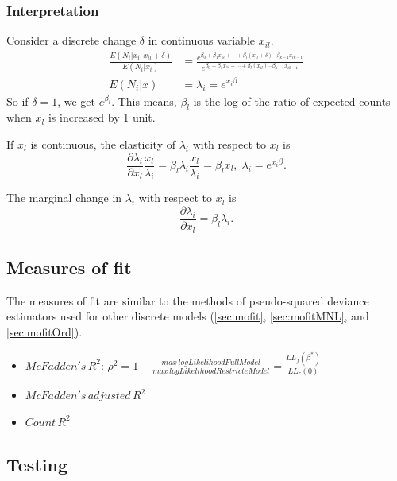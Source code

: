 			\subsubsection{Interpretation}
				Consider a discrete change $\delta$ in continuous variable $x_{il}$.
				\begin{align*}
					\frac{E\left(N_i|x_i,x_{il}+\delta \right)}{E\left(N_i|x_i\right)}&=\frac{e^{\beta_0+\beta_1 x_{1l}+\cdots+\beta_l (x_{il}+\delta) \cdots \beta_{k-1} x_{ik-1}}}{e^{\beta_0+\beta_1 x_{1l}+\cdots+\beta_l (x_{il}) \cdots \beta_{k-1} x_{ik-1}}}\\
					E\left(N_i|x\right)&=\lambda_i=e^{x_i\beta}
				\end{align*}
				So if $\delta=1$, we get $e^{\beta_l}$. This means, $\beta_l$ is the log of the ratio of expected counts when $x_l$ is increased by 1 unit.
				
				If $x_l$ is continuous, the elasticity of $\lambda_i$ with respect to $x_l$ is
				\begin{equation*}
					\frac{\partial \lambda_i}{\partial x_l} \frac{x_l}{\lambda_i}=\beta_l \lambda_i \frac{x_l}{\lambda_i}=\beta_l x_l,\;\lambda_i=e^{x_i\beta}.
				\end{equation*}
				
				The marginal change in $\lambda_i$ with respect to $x_l$ is
				\begin{equation*}
					\frac{\partial \lambda_i}{\partial x_l}=\beta_l \lambda_i.
				\end{equation*}				
			\subsection{Measures of fit}
			The measures of fit are similar to the methods of pseudo-squared deviance estimators used for other discrete models (\ref{sec:mofit}, \ref{sec:mofitMNL}, and \ref{sec:mofitOrd}).
				\begin{itemize}
					\item $McFadden's\,R^2:\,\rho^2=1-\frac{max\,logLikelihoodFullModel}{max\,logLikelihoodRestricteModel}=\frac{LL_f(\beta^*)}{LL_r(0)}$
					\item $McFadden's\,adjusted\,R^2$
					\item $Count\,R^2$		
				\end{itemize}			
			\subsection{Testing}
				
